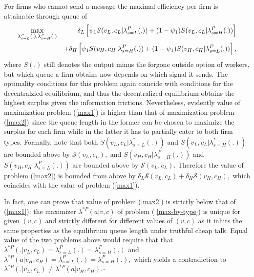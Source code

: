 \documentclass[12pt]{article}
\begin{document}
For firms who cannot send a message the maximal efficiency per firm is
attainable through queue of 
\begin{eqnarray}
\max_{\lambda _{s=L}^{P}(.),\lambda _{s=H}^{P}(.)} &&\delta _{L}\left[ \psi
_{1}S(v_{L},c_{L}|\lambda _{s=L}^{P}(.))+(1-\psi _{1})S(v_{L},c_{L}|\lambda
_{s=H}^{P}(.))\right]  \label{max2} \\
&&+\delta _{H}\left[ \psi _{1}S(v_{H},c_{H}|\lambda _{s=H}^{P}(.))+(1-\psi
_{1})S(v_{H},c_{H}|\lambda _{s=L}^{P}(.))\right] ,  \notag
\end{eqnarray}%
where $S(.)$ still denotes the output minus the forgone outside option of
workers, but which queue a firm obtains now depends on which signal it
sends. The optimality conditions for this problem again coincide with
conditions for the decentralzied equilibrium, and thus the decentralized
equilibrium obtains the highest surplus given the information frictions.
Nevertheless, evidently value of maximization problem (\ref{max1}) is higher
than that of maximization problem (\ref{max2}) since the queue length in the
former can be chosen to maximize the surplus for each firm while in the
latter it has to partially cater to both firm types. Formally, note that
both $S(v_{L},c_{L}|\lambda _{s=L}^{\ast }(.))$ and $S(v_{L},c_{L}|\lambda
_{s=H}^{\ast }(.))$ are bounded above by $\mathcal{S}(v_{L},c_{L}),$ and $%
S(v_{H},c_{H}|\lambda _{s=H}^{P}(.))$ and $S(v_{H},c_{H}|\lambda
_{s=L}^{P}(.))$ are bounded above by $\mathcal{S}(v_{L},c_{L}).$ Therefore
the value of problem (\ref{max2}) is bounded from above by $\delta _{L}%
\mathcal{S}(v_{L},c_{L})+\delta _{H}\mathcal{S}(v_{H},c_{H}),$ which
coincides with the value of problem (\ref{max1}).

In fact, one can prove that value of problem (\ref{max2}) is strictly below
that of (\ref{max1}): the maximizer $\lambda ^{\ast P}(a|v,c)$ of problem (%
\ref{max-by-type}) is unique for given $(v,c)$ and strictly different for
different values of $(v,c)$ as it inhits the same properties as the
equilibrium queue length under truthful cheap talk. Equal value of the two
problems above would require that that $\lambda ^{\ast
P}(.|v_{L},c_{L})=\lambda _{s=L}^{P}(.)=\lambda _{s=H}^{P}(.)\,\ $and $%
\lambda ^{\ast P}(a|v_{H},c_{H})=\lambda _{s=L}^{P}(.)=\lambda
_{s=H}^{P}(.), $ which yields a contradiction to $\lambda ^{\ast
P}(.|v_{L},c_{L})\neq \lambda ^{\ast P}(a|v_{H},c_{H}).\square $


\bigskip
\end{document}
